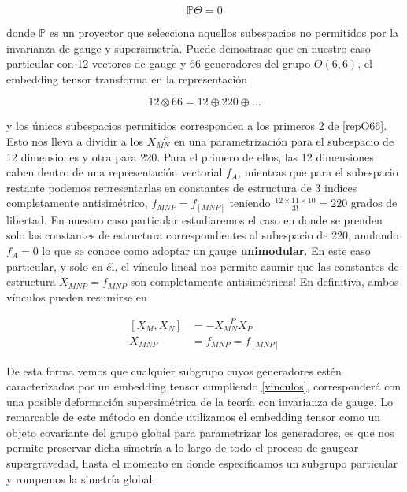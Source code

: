 \documentclass{article}
\numberwithin{equation}{section}
\begin{document}
\begin{equation}\label{vinculolineal}
\mathbb{P} \Theta = 0
\end{equation} 

donde $ \mathbb{P} $ es un proyector que selecciona aquellos subespacios no permitidos por la invarianza de gauge y supersimetría. Puede demostrase que en nuestro caso particular con 12 vectores de gauge y 66 generadores del grupo $ O(6,6) $, el embedding tensor transforma en la representación

\begin{equation}\label{repO66}
12 \otimes 66 = 12 \oplus 220 \oplus \dots
\end{equation}

y los únicos subespacios permitidos corresponden a los primeros 2 de \ref{repO66}. Esto nos lleva a dividir a los $ X_{M N}^{\ \ \ \ P} $ en una parametrización para el subespacio de 12 dimensiones y otra para 220. Para el primero de ellos, las 12 dimensiones caben dentro de una representación vectorial $ f_{A} $, mientras que para el subespacio restante podemos representarlas en constantes de estructura de 3 indices completamente antisimétrico, $ f_{M N P} = f_{\left[M N P\right]} $ teniendo $ \frac{12 \times 11 \times 10}{3!} = 220 $ grados de libertad. En nuestro caso particular estudiaremos el caso en donde se prenden solo las constantes de estructura correspondientes al subespacio de 220, anulando $ f_{A}=0 $ lo que se conoce como adoptar un gauge \textbf{unimodular}. En este caso particular, y solo en él, el vínculo lineal nos permite asumir que las constantes de estructura $ X_{M N P} = f_{M N P}  $ son completamente antisimétricas! En definitiva, ambos vínculos pueden resumirse en

\begin{boxquation}
	\begin{equation}\label{vinculos}
	\begin{aligned}
	\left[X_M, X_N\right] &= - X_{M N}^{\ \ \ \ P} X_P\\
	X_{M N P} &= f_{M N P} = f_{\left[M N P\right]}
	\end{aligned}
	\end{equation}
\end{boxquation}

De esta forma vemos que cualquier subgrupo cuyos generadores estén caracterizados por un embedding tensor cumpliendo \ref{vinculos}, corresponderá con una posible deformación supersimétrica de la teoría con invarianza de gauge. Lo remarcable de este método en donde utilizamos el embedding tensor como un objeto covariante del grupo global para parametrizar los generadores, es que nos permite preservar dicha simetría a lo largo de todo el proceso de gaugear supergravedad, hasta el momento en donde especificamos un subgrupo particular y rompemos la simetría global.\\
\end{document}
